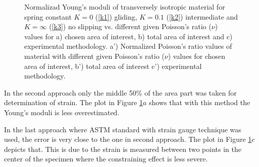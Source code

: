 \documentclass[review]{elsarticle}
\begin{document}
\begin{center}
\begin{figure}[h]
\captionsetup{justification=centering}
\caption{Normalizad Young's moduli of transversely isotropic
material for spring constant $K=0$ (\ref{k1}) gliding, $K=0.1$ (\ref{k2})
intermediate and $K=\infty$ (\ref{k3}) no slipping vs.
different given Poisson's ratio ($\nu$) values for a) chosen area of
interest, b) total area of interest and c) experimental methodology.
a') Normalized Poisson's ratio values of material with different given
Poisson's ratio ($\nu$) values for chosen area of
interest, b') total area of interest c') experimental methodology.}
\label{fig:strainmethods}


\end{figure}
\end{center}



In the second approach only the middle 50\% of the area part was
taken for determination of strain. The plot in Figure \ref{fig:strainmethods}$a$
shows that with this method the Young's moduli is less overestimated.\par
  In the last approach where ASTM standard
with strain gauge technique was used, the error is very close to the one in
second approach. The plot in Figure \ref{fig:strainmethods}$c$ depicts that.
This is due to the strain is measured between two points in the center of 
the specimen where the constraining effect is less severe. 
\end{document}
